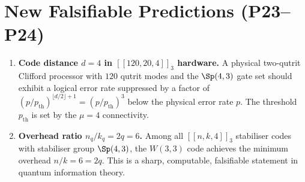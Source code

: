 \section{New Falsifiable Predictions (P23--P24)}
\label{sec:qec_predictions}

\begin{enumerate}[label=\textbf{P\arabic*.},start=23]
  \item \textbf{Code distance $d=4$ in $[[120,20,4]]_3$ hardware.}
        A physical two-qutrit Clifford processor with $120$
        qutrit modes and the $\Sp(4,3)$ gate set should exhibit
        a logical error rate suppressed by a factor of
        $(p/p_{\mathrm{th}})^{\lfloor d/2\rfloor+1}=(p/p_{\mathrm{th}})^3$
        below the physical error rate $p$.  The threshold
        $p_{\mathrm{th}}$ is set by the $\mu=4$ connectivity.
  \item \textbf{Overhead ratio $n_q/k_q = 2q = 6$.}
        Among all $[[n,k,4]]_3$ stabiliser codes with
        stabiliser group $\Sp(4,3)$, the $W(3,3)$ code
        achieves the minimum overhead $n/k=6=2q$.
        This is a sharp, computable, falsifiable statement
        in quantum information theory.
\end{enumerate}
